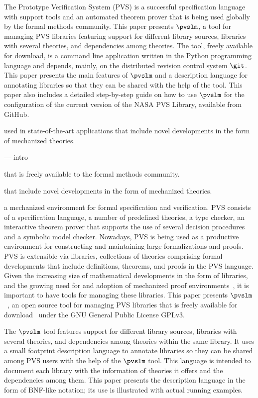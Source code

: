 The Prototype Verification System (PVS) is a successful specification
language with support tools and an automated theorem prover that is
being used globally by the formal methods community. This paper
presents $\pvslm$, a tool for managing PVS libraries featuring support
for different library sources, libraries with several theories, and
dependencies among theories. The tool, freely available for download,
is a command line application written in the Python programming
language and depends, mainly, on the distributed revision control
system $\git$. This paper presents the main features of $\pvslm$ and a
description language for annotating libraries so that they can be
shared with the help of the tool.  This paper also includes a detailed
step-by-step guide on how to use $\pvslm$ for the configuration of the
current version of the NASA PVS Library, available from GitHub.

  used in state-of-the-art applications that include novel
  developments in the form of mechanized theories.
  


--- intro

  


that is
freely available to the formal methods community.



that include novel developments in the form of mechanized theories.



a
mechanized environment for formal specification and verification.  PVS
consists of a specification language, a number of predefined theories,
a type checker, an interactive theorem prover that supports the use of
several decision procedures and a symbolic model checker.  Nowadays,
PVS is being used as a productive environment for constructing and
maintaining large formalizations and proofs. PVS is extensible via
libraries, collections of theories comprising formal developments that
include definitions, theorems, and proofs in the PVS language. Given
the increasing size of mathematical developments in the form of
libraries, and the growing need for and adoption of mechanized proof
environments~\cite{avigad-mech14,hales-proofs14}, it is important to
have tools for managing these libraries. This paper presents
$\pvslm$~\cite{pvslm}, an open source tool for managing PVS libraries
that is freely available for download~\cite{pvslm} under the GNU
General Public License GPLv3.

The $\pvslm$ tool features support for different library sources,
libraries with several theories, and dependencies among theories
within the same library. It uses a small footprint description
language to annotate libraries so they can be shared among PVS users
with the help of the $\pvslm$ tool. This language is intended to
document each library with the information of theories it offers and
the dependencies among them. This paper presents the description
language in the form of BNF-like notation; its use is illustrated with
actual running examples.

